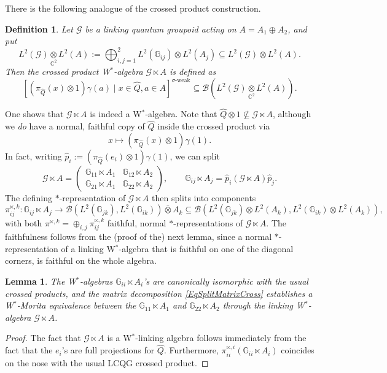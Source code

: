 \documentclass[reqno]{amsart}
\numberwithin{equation}{section}
\newtheorem{Def}[Theorem]{Definition}
\newtheorem{Lem}[Theorem]{Lemma}
\newcommand{\C}{\mathbb{C}}
\newcommand{\mcB}{\mathcal{B}}
\newcommand{\G}{\mathbb{G}}
\newcommand{\msG}{\mathscr{G}}
\begin{document}
There is the following analogue of the crossed product construction. 
\begin{Def}
Let $\msG$ be a linking quantum groupoid acting on $A = A_1 \oplus A_2$, and put
\[
L^2(\msG) \underset{\C^2}{\otimes} L^2(A)  := \bigoplus_{i,j=1}^{2} L^2(\G_{ij}) \otimes L^2(A_j)\subseteq L^2(\msG)\otimes L^2(A).
\]
Then the \emph{crossed product} W$^*$-algebra $\msG\ltimes A$ is defined as 
\[
[(\pi_{\hat{Q}}(x)\otimes 1)\gamma(a)\mid  x\in \hat{Q},a\in A]^{\sigma\textrm{-weak}} \subseteq \mcB(L^2(\msG) \underset{\C^2}{\otimes} L^2(A)). 
\]
\end{Def}
One shows that $\msG\ltimes A$ is indeed a W$^*$-algebra. Note that $\hat{Q}\otimes 1 \nsubseteq \msG\ltimes A$, although we \emph{do} have a normal, faithful copy of $\hat{Q}$ inside the crossed product via
\[
x \mapsto (\pi_{\hat{Q}}(x)\otimes 1)\gamma(1).
\]
In fact, writing $\hat{p}_i := (\pi_{\hat{Q}}(e_i) \otimes 1)\gamma(1)$, we can split 
\begin{equation}\label{EqSplitMatrixCross}
\msG \ltimes A = \begin{pmatrix} \G_{11}\ltimes A_1 & \G_{12} \ltimes A_2 \\ 
\G_{21}\ltimes A_1 & \G_{22}\ltimes A_2\end{pmatrix},  \qquad \G_{ij}\ltimes A_j  = \hat{p}_i (\msG\ltimes A)\hat{p}_j. 
\end{equation}
The defining $*$-representation of $\msG\ltimes A$ then splits into components 
\[
\pi^{\ltimes,k}_{ij}\colon \G_{ij}\ltimes A_j \rightarrow \mcB(L^2(\G_{jk}),L^2(\G_{ik}))\bar{\otimes} A_k \subseteq \mcB(L^2(\G_{jk})\otimes L^2(A_k),L^2(\G_{ik})\otimes L^2(A_k)),
\]
with both $\pi^{\ltimes,k} = \oplus_{i,j} \pi^{\ltimes,k}_{ij}$ faithful, normal $*$-representations of $\msG \ltimes A$. The faithfulness follows from the (proof of the) next lemma, since a normal $*$-representation of a linking W$^*$-algebra that is faithful on one of the diagonal corners, is faithful on the whole algebra.

\begin{Lem}\label{LemMoritaEquivCrossProd}
The W$^*$-algebras $\G_{ii}\ltimes A_i$'s are canonically isomorphic with the usual crossed products, and the matrix decomposition \eqref{EqSplitMatrixCross} establishes a W$^*$-Morita equivalence between the $\G_{11}\ltimes A_1$ and $\G_{22}\ltimes A_2$ through the linking W$^*$-algebra $\msG\ltimes A$.
\end{Lem} 
\begin{proof}
The fact that $\msG\ltimes A$ is a W$^*$-linking algebra follows immediately from the fact that the $e_i$'s are full projections for $\hat{Q}$. Furthermore, $\pi_{ii}^{\ltimes,i}(\G_{ii}\ltimes A_i)$ coincides on the nose with the usual LCQG crossed product. 
\end{proof}
\end{document}
